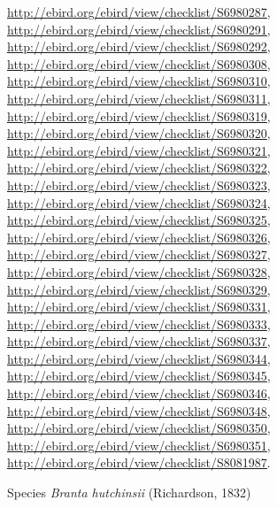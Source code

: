 \documentclass[9pt, article]{memoir}
\begin{document}
\begin{multicols}{2}
\url{http://ebird.org/ebird/view/checklist/S6980287}, 
\url{http://ebird.org/ebird/view/checklist/S6980291}, 
\url{http://ebird.org/ebird/view/checklist/S6980292}, 
\url{http://ebird.org/ebird/view/checklist/S6980308}, 
\url{http://ebird.org/ebird/view/checklist/S6980310}, 
\url{http://ebird.org/ebird/view/checklist/S6980311}, 
\url{http://ebird.org/ebird/view/checklist/S6980319}, 
\url{http://ebird.org/ebird/view/checklist/S6980320}, 
\url{http://ebird.org/ebird/view/checklist/S6980321}, 
\url{http://ebird.org/ebird/view/checklist/S6980322}, 
\url{http://ebird.org/ebird/view/checklist/S6980323}, 
\url{http://ebird.org/ebird/view/checklist/S6980324}, 
\url{http://ebird.org/ebird/view/checklist/S6980325}, 
\url{http://ebird.org/ebird/view/checklist/S6980326}, 
\url{http://ebird.org/ebird/view/checklist/S6980327}, 
\url{http://ebird.org/ebird/view/checklist/S6980328}, 
\url{http://ebird.org/ebird/view/checklist/S6980329}, 
\url{http://ebird.org/ebird/view/checklist/S6980331}, 
\url{http://ebird.org/ebird/view/checklist/S6980333}, 
\url{http://ebird.org/ebird/view/checklist/S6980337}, 
\url{http://ebird.org/ebird/view/checklist/S6980344}, 
\url{http://ebird.org/ebird/view/checklist/S6980345}, 
\url{http://ebird.org/ebird/view/checklist/S6980346}, 
\url{http://ebird.org/ebird/view/checklist/S6980348}, 
\url{http://ebird.org/ebird/view/checklist/S6980350}, 
\url{http://ebird.org/ebird/view/checklist/S6980351}, 
\url{http://ebird.org/ebird/view/checklist/S8081987}.

\vspace{6pt}\noindent\hspace{36pt}Species \textit{Branta hutchinsii} (Richardson, 1832)



\end{multicols}
\end{document}
